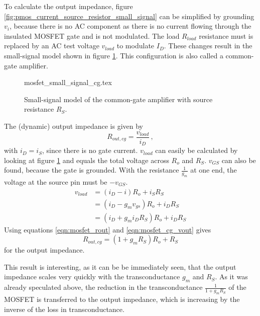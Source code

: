 To calculate the output impedance, figure \ref{fig:pmos_current_source_resistor_small_signal} can be simplified by grounding $v_i$, because there is no AC component as there is no current flowing through the insulated MOSFET gate and is not modulated. The load $R_{load}$ resistance must is replaced by an AC test voltage $v_{load}$ to modulate $I_D$. These changes result in the small-signal model shown in figure \ref{fig:pmos_common_gate_amplifier}. This configuration is also called a common-gate amplifier.

\begin{figure}[ht]
    \centering
    {mosfet_small_signal_cg.tex}
    \caption{Small-signal model of the common-gate amplifier with source resistance $R_S$.}
    \label{fig:pmos_common_gate_amplifier}
\end{figure}

The (dynamic) output impedance is given by
\begin{equation}
    R_{out,cg} = \frac{v_{load}}{i_D}\,, \label{eqn:mosfet_rout}
\end{equation}
with $i_D = i_S$, since there is no gate current. $v_{load}$ can easily be calculated by looking at figure \ref{fig:pmos_common_gate_amplifier} and equals the total voltage across $R_o$ and $R_S$. $v_{GS}$ can also be found, because the gate is grounded. With the resistance $\frac{1}{g_m}$ at one end, the voltage at the source pin must be $-v_{GS}$.
\begin{align}
    v_{load} &= \left(i_D - i\right) R_o + i_S R_S \nonumber\\
    &= \left(i_D - g_m v_{gs}\right) R_o + i_D R_S \nonumber\\
    &= \left(i_D + g_m i_D R_S\right) R_o + i_D R_S \label{eqn:mosfet_cg_vout}
\end{align}
Using equations \ref{eqn:mosfet_rout} and \ref{eqn:mosfet_cg_vout} gives
\begin{equation}
    R_{out,cg} = \left(1 + g_m R_S\right) R_o + R_S \label{eqn:mosfet_cg_rout}
\end{equation}
for the output impedance.

This result is interesting, as it can be be immediately seen, that the output impedance scales very quickly with the transconductance $g_m$ and $R_S$. As it was already speculated above, the reduction in the transconductance $\frac{1}{1 + g_m R_S}$ of the MOSFET is transferred to the output impedance, which is increasing by the inverse of the loss in transconductance.

